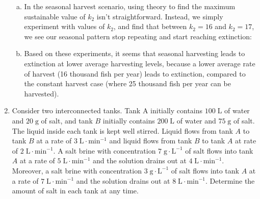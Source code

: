 \begin{enumerate}[1.]
\begin{Solution}
\begin{enumerate}[(a)]
\item In the seasonal harvest scenario, using theory to find the
  maximum sustainable value of $k_2$ isn't straightforward.  Instead,
  we simply experiment with values of $k_2$, and find that between
  $k_2 = 16$ and $k_2 = 17$, we see our seasonal pattern stop
  repeating and start reaching extinction:

\begin{center}
\end{center}

\item Based on these experiments, it seems that seasonal harvesting
  leads to extinction at lower average harvesting levels, because a
  lower average rate of harvest (16 thousand fish per year) leads to
  extinction, compared to the constant harvest case (where 25 thousand
  fish per year can be harvested).
\end{enumerate}
\end{Solution}

\item \begin{Question}
Consider two interconnected tanks.  Tank A initially contains $100 \; \text{L}$
of water and $20 \; \text{g}$ of salt, and tank $B$ initially contains $200 \;
\text{L}$ of water and $75 \; \text{g}$ of salt.  The liquid inside each tank is
kept well stirred.  Liquid flows from tank $A$ to tank $B$ at a rate of $3 \;
\text{L} \cdot \text{min}^{-1}$ and liquid flows from tank $B$ to tank $A$ at
rate of $2 \; \text{L} \cdot \text{min}^{-1}$.  A salt brine with concentration
$7 \; \text{g} \cdot \text{L}^{-1}$ of salt flows into tank $A$ at a rate of $5
\; \text{L} \cdot \text{min}^{-1}$ and the solution drains out at $4 \; \text{L}
\cdot \text{min}^{-1}$.  Moreover, a salt brine with concentration $3 \;
\text{g} \cdot \text{L}^{-1}$ of salt flows into tank $A$ at a rate of $7 \;
\text{L} \cdot \text{min}^{-1}$ and the solution drains out at $8 \; \text{L}
\cdot \text{min}^{-1}$. Determine the amount of salt in each tank at any time.
  
\end{Question}


\end{enumerate}
